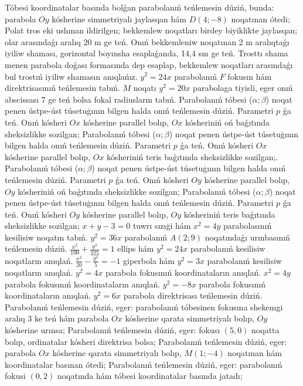 Tóbesi koordinatalar basında bolǵan parabolanıń teńlemesin dúziń, bunda: parabola $Oy$ kósherine simmetriyalı jaylasqan hám $D (4; -8) $ noqatınan ótedi;
Polat tros eki ushınan ildirilgen; bekkemlew noqatları birdey biyiklikte jaylasqan; olar arasındaǵı aralıq 20 m ge teń. Onıń bekkemleniw noqatınan 2 m aralıqtaǵı iyiliw shaması, gorizontal boyınsha esaplaǵanda, 14,4 sm ge teń. Trosttı shama menen parabola doǵası formasında dep esaplap, bekkemlew noqatları arasındaǵı bul trostıń iyiliw shamasın anıqlańız.
$y^2=24 x$ parabolanıń $F$ fokusın hám direktrisasınıń teńlemesin tabıń.
$M$ noqatı $y^2=20 x$ parabolaga tiyisli, eger onıń abscissası 7 ge teń bolsa fokal radiusların tabıń.
Parabolanıń tóbesi ($\alpha;\beta$) noqat penen ústpe-úst túsetuģının bilgen halda onıń teńlemesin dúziń. Parametri $p$ ǵa teń. Onıń kósheri $O x$ kósherine parallel bolıp, $O x$ kósheriniń oń baǵıtında sheksizlikke sozilgan;
Parabolanıń tóbesi ($\alpha;\beta$) noqat penen ústpe-úst túsetuģının bilgen halda onıń teńlemesin dúziń. Parametri $p$ ǵa teń. Onıń kósheri $O x$ kósherine parallel bolıp, $O x$ kósheriniń teris baǵıtında sheksizlikke sozilgan;.
Parabolanıń tóbesi ($\alpha;\beta$) noqat penen ústpe-úst túsetuģının bilgen halda onıń teńlemesin dúziń. Parametri $p$ ǵa teń. Onıń kósheri $O y$ kósherine parallel bolıp, $O y$ kósheriniń oń baǵıtında sheksizlikke sozilgan;
Parabolanıń tóbesi ($\alpha;\beta$) noqat penen ústpe-úst túsetuģının bilgen halda onıń teńlemesin dúziń. Parametri $p$ ǵa teń. Onıń kósheri $O y$ kósherine parallel bolıp, $O y$ kósheriniń teris baǵıtında sheksizlikke sozilgan;
$x+y-3=0$ tuwrı sızıģi hám $x^2=4 y$ parabolasınıń kesilisiw noqatın tabıń.
$y^2=36 x$ parabolanıń $A (2; 9) $ noqatındaǵı urınbasınıń teńlemesin dúziń.
$\frac{x^2}{100}+\frac{y^2}{225}=1$ ellips hám $y^2=24 x$ parabolanıń kesilisiw noqatların anıqlań.
$\frac{x^2}{20}-\frac{y^2}{5}=-1$ giperbola hám $y^2=3 x$ parabolanıń kesilisiw noqatların anıqlań.
$y^2=4 x$ parabola fokusınıń koordinataların anıqlań.
$x^2=4 y$ parabola fokusınıń koordinataların anıqlań.
$y^2=-8 x$ parabola fokusınıń koordinataların anıqlań.
$y^2=6 x$ parabola direktrisası teńlemesin dúziń.
Parabolanıń teńlemesin dúziń, eger: parabolanıń tóbesinen fokusına shekemgi aralıq 3 ke teń hám parabola $O x$ kósherine qarata simmetriyalı bolıp, $O y$ kósherine urınsa;
Parabolanıń teńlemesin dúziń, eger: fokusı $ (5,0) $ noqatta bolıp, ordinatalar kósheri direktrisa bolsa;
Parabolanıń teńlemesin dúziń, eger: parabola $O x$ kósherine qarata simmetriyalı bolıp, $M (1;-4) $ noqatınan hám koordinatalar basınan ótedi;
Parabolanıń teńlemesin dúziń, eger: parabolanıń fokusi $ (0,2) $ noqatında hám tóbesi koordinatalar basında jatadı;
